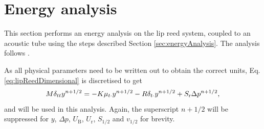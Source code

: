 \section{Energy analysis}\label{sec:energyAnalysisLipreed}
This section performs an energy analysis on the lip reed system, coupled to an acoustic tube using the steps described Section \ref{sec:energyAnalysis}. The analysis follows \cite[Sec 5.1.3, p. 139]{Harrison2018}.

As all physical parameters need to be written out to obtain the correct units, Eq. \eqref{eq:lipReedDimensional} is discretised to get
\begin{equation}\label{eq:discLipreedDimensional}
    M\delta_{tt}y^{n+1/2} = -K\mu_{t\cdot}y^{n+1/2}-R\delta_{t\cdot}y^{n+1/2} + S_\text{r}\Delta p^{n+1/2},
\end{equation} 
and will be used in this analysis. Again, the superscript $n+1/2$ will be suppressed for $y$, $\Delta p$, $U_\text{B}$, $U_\text{r}$, $S_{1/2}$ and $v_{1/2}$ for brevity.


